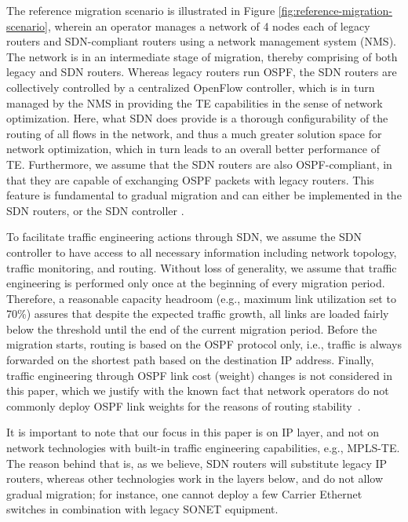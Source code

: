 \documentclass[conference]{IEEEtran}
\begin{document}
\par The reference migration scenario is illustrated in Figure
\ref{fig:reference-migration-scenario}, wherein an operator manages a network of
4 nodes each of legacy routers and SDN-compliant routers using a network
management system (NMS). The network is in an intermediate stage of migration,
thereby comprising of both legacy and SDN routers. Whereas legacy routers run
OSPF, the SDN routers are collectively controlled by a centralized OpenFlow
controller, which is in turn managed by the NMS in providing the TE capabilities
in the sense of network optimization. Here, what SDN does provide is a thorough
configurability of the routing of all flows in the network, and thus a much
greater solution space for network optimization, which in turn leads to an
overall better performance of TE. Furthermore, we assume that the SDN routers
are also OSPF-compliant, in that they are capable of exchanging OSPF packets
with legacy routers. This feature is fundamental to gradual migration and can
either be implemented in the SDN routers, or the SDN controller
\cite{routeflow}.

\par To facilitate traffic engineering actions through SDN, we assume the SDN
controller to have access to all necessary information including network
topology, traffic monitoring, and routing. Without loss of generality, we assume that
traffic engineering is performed only once at the beginning of every migration
period. Therefore, a reasonable capacity headroom (e.g., maximum link
utilization set to 70\%) assures that despite the expected traffic growth, all
links are loaded fairly below the threshold until the end of the current
migration period. Before the migration starts, routing is based on the OSPF
protocol only, i.e., traffic is always forwarded on the shortest path based on
the destination IP address. Finally, traffic engineering through OSPF link cost
(weight) changes is not considered in this paper, which we justify with the
known fact that network operators do not commonly deploy OSPF link weights for
the reasons of routing stability~\cite{dynamicRouting}. 


\par It is important to note that our focus in this paper is on IP layer, and
not on network technologies with built-in traffic engineering capabilities,
e.g., MPLS-TE. The reason behind that is, as we believe, SDN routers will
substitute legacy IP routers, whereas other technologies work in the layers
below, and do not allow gradual migration; for instance, one cannot deploy a few
Carrier Ethernet switches in combination with legacy SONET equipment.
\end{document}
